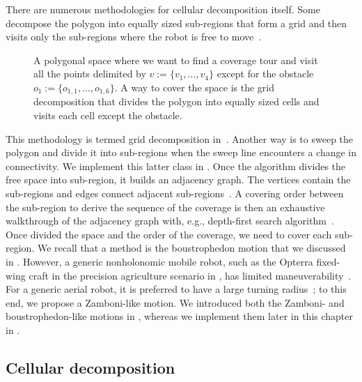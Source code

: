 There are numerous methodologies for cellular decomposition itself. Some decompose the polygon into equally sized sub-regions that form a grid and then visits only the sub-regions where the robot is free to move~\citep{galceran2013survey}. 
\begin{figure}[h!]
  \centering
  \selectfont
  
  \caption[Grid decomposition]{A polygonal space where we want to find a coverage tour and visit all the points delimited by $v:=\{v_1,\dots,v_4\}$ except for the obstacle $o_1:=\{o_{1,1},\dots,o_{1,6}\}$. A way to cover the space is the grid decomposition that divides the polygon into equally sized cells and visits each cell except the obstacle.}
  \label{fig:gride}
\end{figure}
This methodology is termed grid decomposition in~. Another way is to sweep the polygon and divide it into sub-regions when the sweep line encounters a change in connectivity. We implement this latter class in .
Once the algorithm divides the free space into sub-region, it builds an adjacency graph. The vertices contain the sub-regions and edges connect adjacent sub-regions~\citep{choset2005principles}. A covering order between the sub-region to derive the sequence of the coverage is then an exhaustive walkthrough of the adjacency graph with, e.g., depth-first search algorithm~\citep{choset2005principles}. Once divided the space and the order of the coverage, we need to cover each sub-region. We recall that a method is the boustrophedon motion that we discussed in . However, a generic nonholonomic mobile robot, such as the Opterra fixed-wing craft in the precision agriculture scenario in , has limited maneuverability~\citep{mannadiar2010optimal,xu2011optimal,xu2014efficient}. For a generic aerial robot, it is preferred to have a large turning radius~\citep{wang2017curvature}; to this end, we propose a Zamboni-like motion. We introduced both the Zamboni- and boustrophedon-like motions in , whereas we implement them later in this chapter in .

\subsection{Cellular decomposition}
\label{sec:cell-deco}

